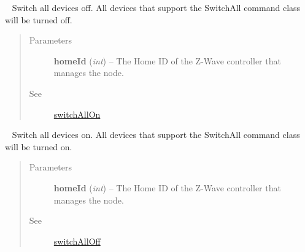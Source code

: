 \documentclass[letterpaper,10pt,english]{sphinxmanual}
\begin{document}
\begin{fulllineitems}
\begin{fulllineitems}
\begin{quote}
\begin{description}
\end{description}\end{quote}

\end{fulllineitems}


\begin{fulllineitems}
\label{libopenzwave:libopenzwave.PyManager.switchAllOff}~\label{libopenzwave:switchalloff}
Switch all devices off.  All devices that support the SwitchAll command class
will be turned off.
\begin{quote}\begin{description}
\item[{Parameters}] \leavevmode
\textbf{homeId} (\emph{int}) -- The Home ID of the Z-Wave controller that manages the node.

\item[{See}] \leavevmode
{\hyperref[libopenzwave:switchallon]{switchAllOn}}

\end{description}\end{quote}

\end{fulllineitems}


\begin{fulllineitems}
\label{libopenzwave:libopenzwave.PyManager.switchAllOn}~\label{libopenzwave:switchallon}
Switch all devices on.  All devices that support the SwitchAll command class
will be turned on.
\begin{quote}\begin{description}
\item[{Parameters}] \leavevmode
\textbf{homeId} (\emph{int}) -- The Home ID of the Z-Wave controller that manages the node.

\item[{See}] \leavevmode
{\hyperref[libopenzwave:switchalloff]{switchAllOff}}

\end{description}\end{quote}

\end{fulllineitems}



\end{fulllineitems}
\end{document}
